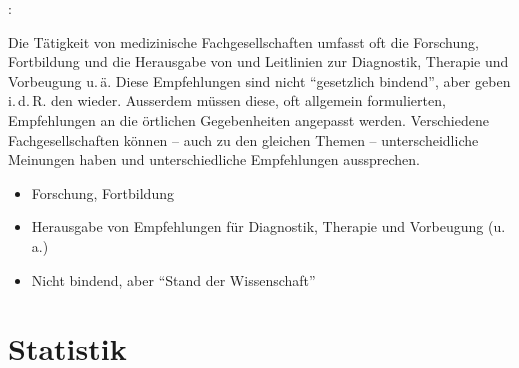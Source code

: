 \cite{Bahr200701}: 

{%
\label{topic:fachgesellschaft}
Die Tätigkeit von medizinische Fachgesellschaften umfasst
oft die Forschung, Fortbildung und die Herausgabe von
 und Leitlinien zur Diagnostik, Therapie
und Vorbeugung u.\,ä. Diese Empfehlungen sind nicht
\enquote{gesetzlich bindend}, aber geben i.\,d.\,R. den
 wieder. Ausserdem müssen diese,
oft allgemein formulierten, Empfehlungen an die örtlichen
Gegebenheiten angepasst werden. Verschiedene
Fachgesellschaften können -- auch zu den gleichen Themen --
unterscheidliche Meinungen haben und unterschiedliche
Empfehlungen aussprechen.
}{%
\begin{itemize}
   \item Forschung, Fortbildung 
   \item Herausgabe von Empfehlungen für Diagnostik, Therapie und
   Vorbeugung (u.\,a.)
   \item Nicht bindend, aber \enquote{Stand der Wissenschaft}
\end{itemize}
}{}{}{}




\section{Statistik}



\ChapterEnd